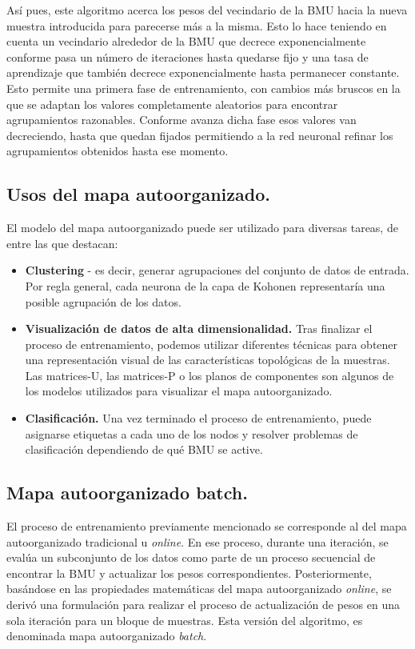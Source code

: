 Así pues, este algoritmo acerca los pesos del vecindario de la BMU hacia la nueva muestra introducida para parecerse más a la misma. Esto lo hace teniendo en cuenta un vecindario alrededor de la BMU que decrece exponencialmente conforme pasa un número de iteraciones hasta quedarse fijo y una tasa de aprendizaje que también decrece exponencialmente hasta permanecer constante. \\

Esto permite una primera fase de entrenamiento, con cambios más bruscos en la que se adaptan los valores completamente aleatorios para encontrar agrupamientos razonables. Conforme avanza dicha fase esos valores van decreciendo, hasta que quedan fijados permitiendo a la red neuronal refinar los agrupamientos obtenidos hasta ese momento.\\

\subsection{Usos del mapa autoorganizado.}
El modelo del mapa autoorganizado puede ser utilizado para diversas tareas, de entre las que destacan:

\begin{itemize}
	\item \textbf{Clustering} - es decir, generar agrupaciones del conjunto de datos de entrada. Por regla general, cada neurona de la capa de Kohonen representaría una posible agrupación de los datos. 

	\item \textbf{Visualización de datos de alta dimensionalidad.} Tras finalizar el proceso de entrenamiento, podemos utilizar diferentes técnicas para obtener una representación visual de las características topológicas de la muestras. Las matrices-U, las matrices-P o los planos de componentes son algunos de los modelos utilizados para visualizar el mapa autoorganizado.

	\item \textbf{Clasificación.} Una vez terminado el proceso de entrenamiento, puede asignarse etiquetas a cada uno de los nodos y resolver problemas de clasificación dependiendo de qué BMU se active. 
	\end{itemize}

\subsection{Mapa autoorganizado batch.}
El proceso de entrenamiento previamente mencionado se corresponde al del mapa autoorganizado tradicional u \textit{online}. En ese proceso, durante una iteración, se evalúa un subconjunto de los datos como parte de un proceso secuencial de encontrar la BMU y actualizar los pesos correspondientes. Posteriormente, basándose en las propiedades matemáticas del mapa autoorganizado \textit{online}, se derivó una formulación para realizar el proceso de actualización de pesos en una sola iteración para un bloque de muestras. Esta versión del algoritmo, es denominada mapa autoorganizado \textit{batch}. \\

